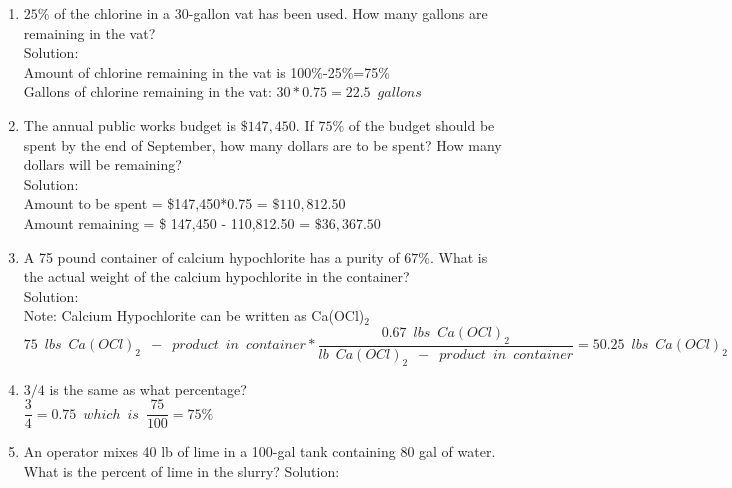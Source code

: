 \documentclass{article}
\begin{document}
\begin{enumerate}

\item $25 \%$ of the chlorine in a 30-gallon vat has been used. How many gallons are remaining in the vat?\\
Solution:\\
Amount of chlorine remaining in the vat is 100\%-25\%=75\%\\

Gallons of chlorine remaining in the vat: $30*0.75=\boxed{22.5 \enspace gallons}$

\item The annual public works budget is $\$ 147,450$. If $75 \%$ of the budget should be spent by the end of September, how many dollars are to be spent? How many dollars will be remaining?\\
\vspace{0.2cm}
Solution:\\
Amount to be spent = \$147,450*0.75 = $\boxed{\$110,812.50}$\\
\vspace{0.2cm}
Amount remaining = \$ 147,450 - 110,812.50 = $\boxed{\$36,367.50}$

\item A 75 pound container of calcium hypochlorite has a purity of $67 \%$. What is the actual weight of the calcium hypochlorite in the container? \\
\vspace{0.2cm}
Solution:\\
Note: Calcium Hypochlorite can be written as Ca(OCl)$_2$\\
$75 \enspace lbs \enspace Ca(OCl)_2 \enspace - \enspace product \enspace in \enspace container*\dfrac{0.67 \enspace lbs \enspace Ca(OCl)_2 }{lb \enspace Ca(OCl)_2  \enspace - \enspace product \enspace in \enspace container} = \boxed{50.25 \enspace lbs \enspace Ca(OCl)_2}$\\
\vspace{0.2cm}


\item $3 / 4$ is the same as what percentage?\\
\vspace{0.2cm}
$\dfrac{3}{4}=0.75 \enspace which \enspace is \enspace \dfrac{75}{100} = \boxed{75\%}$\\
\vspace{0.2cm}

\item An operator mixes 40 lb of lime in a 100-gal tank containing 80 gal of water. What is the percent of lime in the slurry?
\vspace{0.2cm}
Solution:\\
\vspace{0.2cm}
\end{enumerate}
\end{document}
